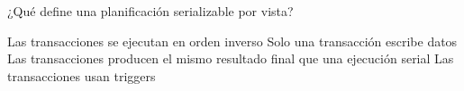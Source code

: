 \question[1] ¿Qué define una planificación serializable por vista?
\begin{choices}
\choice Las transacciones se ejecutan en orden inverso
\choice Solo una transacción escribe datos
\CorrectChoice Las transacciones producen el mismo resultado final que una ejecución serial
\choice Las transacciones usan triggers
\end{choices}